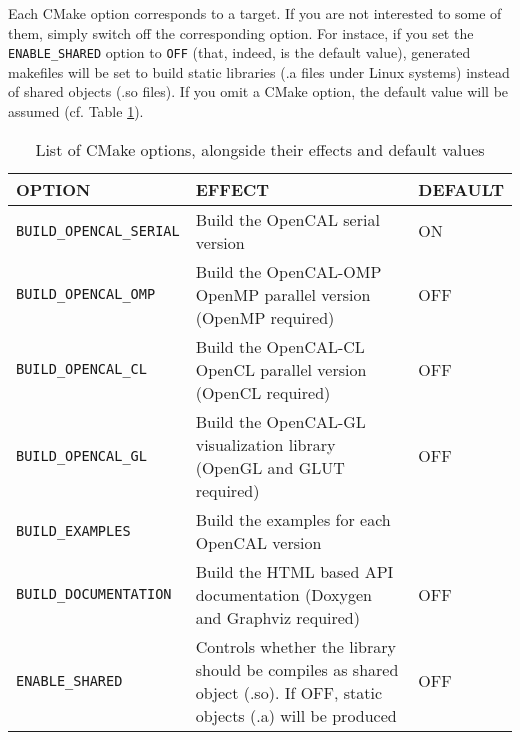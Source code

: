 Each CMake option corresponds to a target. If you are not interested
to some of them, simply switch off the corresponding option. For
instace, if you set the \verb'ENABLE_SHARED' option to \verb'OFF'
(that, indeed, is the default value), generated makefiles will be set
to build static libraries (.a files under Linux systems) instead of
shared objects (.so files). If you omit a CMake option, the default
value will be assumed (cf. Table \ref{ch:installation:cmakeoptions}).


\begin{table}[]
  \centering
  \caption{List of CMake options, alongside their effects and default
    values}
  \label{ch:installation:cmakeoptions}
  \begin{tabularx}{\textwidth}{lXl}
    \hline
    \textbf{OPTION} & \textbf{EFFECT} & \textbf{DEFAULT}\\
    \hline\hline
    \texttt{BUILD\_OPENCAL\_SERIAL} & Build the OpenCAL serial version  & ON   \\ \hline
    \texttt{BUILD\_OPENCAL\_OMP} &  Build the OpenCAL-OMP OpenMP parallel version (OpenMP required)    & OFF \\ \hline
    \texttt{BUILD\_OPENCAL\_CL} &  Build the OpenCAL-CL OpenCL parallel version (OpenCL required)     &OFF\\ \hline
    \texttt{BUILD\_OPENCAL\_GL} & Build the OpenCAL-GL visualization library (OpenGL and GLUT required)      &OFF \\ \hline                          
    \texttt{BUILD\_EXAMPLES} & Build the examples for each OpenCAL version      &\\ \hline
    \texttt{BUILD\_DOCUMENTATION}  &  Build the HTML based API documentation (Doxygen and Graphviz required)  & OFF   \\ \hline
    \texttt{ENABLE\_SHARED} &  Controls whether the library should be compiles as shared object (.so). If OFF, static objects (.a) will be produced & OFF\\ \hline                        
  \end{tabularx}
\end{table}


